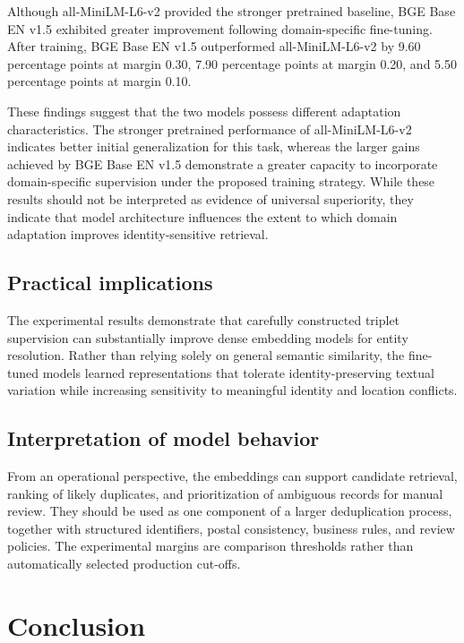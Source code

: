 \documentclass{article}
\begin{document}
Although all-MiniLM-L6-v2 provided the stronger pretrained baseline, BGE Base EN v1.5 exhibited greater improvement following domain-specific fine-tuning. After training, BGE Base EN v1.5 outperformed all-MiniLM-L6-v2 by 9.60 percentage points at margin 0.30, 7.90 percentage points at margin 0.20, and 5.50 percentage points at margin 0.10.

These findings suggest that the two models possess different adaptation characteristics. The stronger pretrained performance of all-MiniLM-L6-v2 indicates better initial generalization for this task, whereas the larger gains achieved by BGE Base EN v1.5 demonstrate a greater capacity to incorporate domain-specific supervision under the proposed training strategy. While these results should not be interpreted as evidence of universal superiority, they indicate that model architecture influences the extent to which domain adaptation improves identity-sensitive retrieval.

\subsection{Practical implications}

The experimental results demonstrate that carefully constructed triplet supervision can substantially improve dense embedding models for entity resolution. Rather than relying solely on general semantic similarity, the fine-tuned models learned representations that tolerate identity-preserving textual variation while increasing sensitivity to meaningful identity and location conflicts.

\subsection{Interpretation of model behavior}

From an operational perspective, the embeddings can support candidate retrieval, ranking of likely duplicates, and prioritization of ambiguous records for manual review. They should be used as one component of a larger deduplication process, together with structured identifiers, postal consistency, business rules, and review policies. The experimental margins are comparison thresholds rather than automatically selected production cut-offs.

\section{Conclusion}
\label{sec:conclusion}
\end{document}
